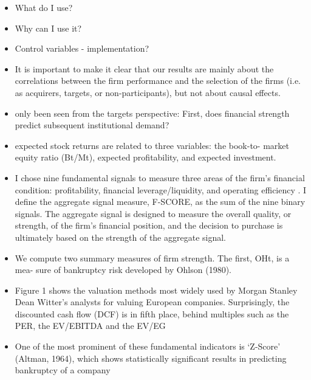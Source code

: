 \documentclass[12pt]{article}
\begin{document}
    \begin{itemize}
            \item What do I use? 
            \item Why can I use it?
            \item Control variables - implementation?

            \item It is important to make it clear that our results are mainly about the correlations between the firm performance and the selection of the firms (i.e. as acquirers, targets, or non-participants), but not about causal effects. \citep{Liu2013}

            \item only been seen from the targets perspective: First, does financial strength predict subsequent institutional demand? \citep{Choi2012}

            \item expected stock returns are related to three variables: the book-to-
            market equity ratio (Bt/Mt), expected profitability, and expected investment.\citep{Fama2006}
            
            \item I chose nine fundamental signals to measure three areas of the firm's financial condition: profitability, financial leverage/liquidity, and operating efficiency \citep{Piotroski2000}. I define the aggregate signal measure, F-SCORE, as the sum of the nine binary signals. The aggregate signal is designed to measure the overall quality, or strength, of the firm's financial position, and the decision to purchase is ultimately based on the strength of the aggregate signal.

            \item We compute two summary measures of firm strength. The first, OHt, is a mea- sure of bankruptcy risk developed by Ohlson (1980).\citep{Fama2006}

            \item Figure 1 shows the valuation methods most widely used by Morgan Stanley Dean Witter’s analysts for valuing European companies. Surprisingly, the discounted cash flow (DCF) is in fifth place, behind multiples such as the PER, the EV/EBITDA and the EV/EG \citep{Fernandez2001}

            \item One of the most prominent of these fundamental indicators is ‘Z-Score’ (Altman, 1964), which shows statistically significant results in predicting bankruptcy of a company \citep{Mohr2012}


\end{itemize}
\end{document}
